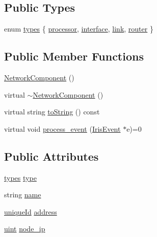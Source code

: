 \subsection*{Public Types}
\begin{CompactItemize}
\item 
enum \hyperlink{classNetworkComponent_de3a046109ffaae8ea087feaf879b331}{types} \{ \hyperlink{classNetworkComponent_de3a046109ffaae8ea087feaf879b3310af6940aa4e653f8c152d92670a4370c}{processor}, 
\hyperlink{classNetworkComponent_de3a046109ffaae8ea087feaf879b331a5fd9b1f5cc536ac79e394578ed0a9f1}{interface}, 
\hyperlink{classNetworkComponent_de3a046109ffaae8ea087feaf879b331380174d2fb34d464f89e0f470b33102a}{link}, 
\hyperlink{classNetworkComponent_de3a046109ffaae8ea087feaf879b3318f51c4a212c73a9b847767591aa7828e}{router}
 \}
\subsection*{Public Member Functions}
\begin{CompactItemize}
\item 
\hyperlink{classNetworkComponent_fbc5367d657f132a271f4e48c1523790}{NetworkComponent} ()
\item 
virtual \hyperlink{classNetworkComponent_05adbdf1cb3611bbfd937887065d3feb}{$\sim$NetworkComponent} ()
\item 
virtual string \hyperlink{classNetworkComponent_9bb9874e1f5705588cb3d9c201d8fc6f}{toString} () const 
\item 
virtual void \hyperlink{classNetworkComponent_c93793eea1e2d424abe86e110ca8b399}{process\_\-event} (\hyperlink{classIrisEvent}{IrisEvent} $\ast$e)=0
\end{CompactItemize}
\subsection*{Public Attributes}
\begin{CompactItemize}
\item 
\hyperlink{classNetworkComponent_de3a046109ffaae8ea087feaf879b331}{types} \hyperlink{classNetworkComponent_702663f5fd8d99b8a62449a1106e0ed6}{type}
\item 
string \hyperlink{classNetworkComponent_377732efece6236958869713b6f30044}{name}
\item 
\hyperlink{ringSim_8cc_880960a57c549f69d77cf01237366978}{uniqueId} \hyperlink{classNetworkComponent_0428749bde908497630b506071d52191}{address}
\item 
\hyperlink{outputBuffer_8h_91ad9478d81a7aaf2593e8d9c3d06a14}{uint} \hyperlink{classNetworkComponent_56599b3484333fb78af1b6c33f77cf16}{node\_\-ip}
\end{CompactItemize}



\end{CompactItemize}
